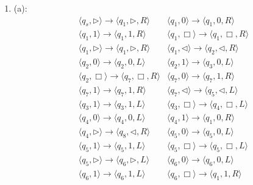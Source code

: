 \documentclass[12pt,a4paper]{article}
\makeatletter
\newtheorem*{solution}{Solution}
\theoremstyle{definition}
\renewenvironment{solution}[1][Solution] {\par\pushQED{\qed}\normalfont\topsep6\p@\@plus6\p@\relax\trivlist\item[\hskip\labelsep\bfseries#1\@addpunct{.}]\ignorespaces}{\popQED\endtrivlist\@endpefalse} \makeatother
\makeatother
\begin{document}
\begin{enumerate}
    \begin{solution}
    (a):\\
    \begin{equation*}
        \begin{aligned}
        & \langle q_s, \triangleright \rangle  \rightarrow  \langle q_1, \triangleright, R\rangle
        & \langle q_1, 0 \rangle  \rightarrow  \langle q_1, 0, R\rangle \\
        & \langle q_1, 1 \rangle  \rightarrow  \langle q_1, 1, R\rangle
        & \langle q_1, \Box \rangle  \rightarrow  \langle q_1, \Box, R\rangle \\
        & \langle q_1, \triangleright \rangle  \rightarrow  \langle q_1, \triangleright, R\rangle
        & \langle q_1, \triangleleft \rangle  \rightarrow  \langle q_2, \triangleleft, R\rangle   \\
        & \langle q_2, 0 \rangle  \rightarrow  \langle q_2, 0, L\rangle
        & \langle q_2, 1 \rangle  \rightarrow  \langle q_3, 0, L\rangle \\
        & \langle q_2, \Box \rangle  \rightarrow  \langle q_7, \Box, R\rangle 
        & \langle q_7, 0 \rangle  \rightarrow  \langle q_7, 1, R\rangle \\
        & \langle q_7, 1 \rangle  \rightarrow  \langle q_7, 1, R\rangle
        & \langle q_7, \triangleleft \rangle  \rightarrow  \langle q_5, \triangleleft, L\rangle  \\
        & \langle q_3, 1 \rangle  \rightarrow  \langle q_3, 1, L\rangle
        & \langle q_3, \Box \rangle  \rightarrow  \langle q_4, \Box, L\rangle \\
        & \langle q_4, 0 \rangle  \rightarrow  \langle q_4, 0, L\rangle 
        & \langle q_4, 1 \rangle  \rightarrow  \langle q_1, 0, R\rangle \\
        & \langle q_4, \triangleright \rangle  \rightarrow  \langle q_8, \triangleleft, R\rangle
        & \langle q_5, 0 \rangle  \rightarrow  \langle q_5, 0, L\rangle  \\
        & \langle q_5, 1 \rangle  \rightarrow  \langle q_5, 1, L\rangle
        & \langle q_5, \Box \rangle  \rightarrow  \langle q_5, \Box, L\rangle \\
        & \langle q_5, \triangleright \rangle  \rightarrow  \langle q_6, \triangleright, L\rangle 
        & \langle q_6, 0 \rangle  \rightarrow  \langle q_6, 0, L\rangle \\
        & \langle q_6, 1 \rangle  \rightarrow  \langle q_6, 1, L\rangle
        & \langle q_6, \Box \rangle  \rightarrow  \langle q_1, 1, R\rangle  \\

\end{aligned}
\end{equation*}
\end{solution}
\end{enumerate}
\end{document}
